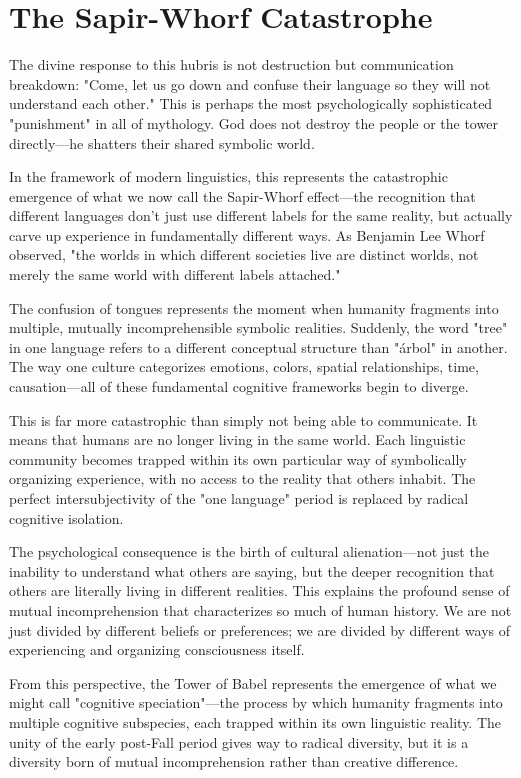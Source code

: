 \section{The Sapir-Whorf Catastrophe}

The divine response to this hubris is not destruction but communication breakdown: "Come, let us go down and confuse their language so they will not understand each other." This is perhaps the most psychologically sophisticated "punishment" in all of mythology. God does not destroy the people or the tower directly—he shatters their shared symbolic world.

In the framework of modern linguistics, this represents the catastrophic emergence of what we now call the Sapir-Whorf effect—the recognition that different languages don't just use different labels for the same reality, but actually carve up experience in fundamentally different ways. As Benjamin Lee Whorf observed, "the worlds in which different societies live are distinct worlds, not merely the same world with different labels attached."

The confusion of tongues represents the moment when humanity fragments into multiple, mutually incomprehensible symbolic realities. Suddenly, the word "tree" in one language refers to a different conceptual structure than "árbol" in another. The way one culture categorizes emotions, colors, spatial relationships, time, causation—all of these fundamental cognitive frameworks begin to diverge.

This is far more catastrophic than simply not being able to communicate. It means that humans are no longer living in the same world. Each linguistic community becomes trapped within its own particular way of symbolically organizing experience, with no access to the reality that others inhabit. The perfect intersubjectivity of the "one language" period is replaced by radical cognitive isolation.

The psychological consequence is the birth of cultural alienation—not just the inability to understand what others are saying, but the deeper recognition that others are literally living in different realities. This explains the profound sense of mutual incomprehension that characterizes so much of human history. We are not just divided by different beliefs or preferences; we are divided by different ways of experiencing and organizing consciousness itself.

From this perspective, the Tower of Babel represents the emergence of what we might call "cognitive speciation"—the process by which humanity fragments into multiple cognitive subspecies, each trapped within its own linguistic reality. The unity of the early post-Fall period gives way to radical diversity, but it is a diversity born of mutual incomprehension rather than creative difference.


